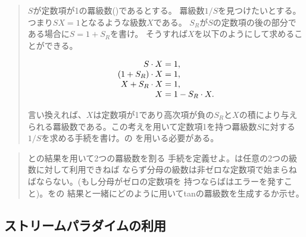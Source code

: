 \begin{quote}
\( S \)が定数項が1の羃級数()であるとする。
羃級数\( 1 / S \)を見つけたいとする。つまり\( SX = 1 \)となるような級数\( X \)である。
\( S_R \)が\( S \)の定数項の後の部分である場合に\( S = 1 + S_R \)を書け。
そうすれば\( X \)を以下のようにして求めることができる。
\begin{comment}

\begin{example}
        S * X = 1
(1 + S_R) * X = 1
  X + S_R * X = 1
            X = 1 - S_R * X
\end{example}

\end{comment}
\begin{displaymath}
\begin{array}{r@{{}={}}l}
	        S \cdot X 	& 1, \\
	(1 + S_R) \cdot X 	& 1, \\
	  X + S_R \cdot X 	& 1, \\
	            	X 	& 1 - S_R \cdot X. 
\end{array}
\end{displaymath}


言い換えれば、\( X \)は定数項が1であり高次項が負の\( S_R \)と\( X \)の積により与え
られる羃級数である。この考えを用いて定数項1を持つ羃級数\( S \)に対する
\( 1 / S \)を求める手続を書け。の
を用いる必要がある。
\end{quote}

\begin{quote}
との結果を用いて2つの羃級数を割る
手続を定義せよ。は任意の2つの級数に対して利用できねば
ならず分母の級数は非ゼロな定数項で始まらねばならない。(もし分母がゼロの定数項を
持つならばはエラーを発すこと)。をの
結果と一緒にどのように用いてtanの羃級数を生成するか示せ。
\end{quote}

\subsection{ストリームパラダイムの利用}
\label{Section 3.5.3}


